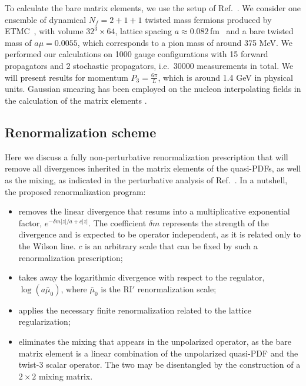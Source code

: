 \medskip
To calculate the bare matrix elements, we use the setup of Ref.~\cite{Alexandrou:2016jqi}.
We consider one ensemble of dynamical $N_f{=}2{+}1{+}1$ twisted mass fermions produced by ETMC~\cite{Baron:2010bv}, with volume
$32^3 {\times} 64$, lattice spacing $a {\approx}0.082$\,fm~\cite{Carrasco:2014cwa} and a bare twisted mass of $a\mu {=} 0.0055$,
which corresponds to a pion mass of around 375 MeV. We performed our calculations on 1000 gauge configurations with 15
forward propagators and 2 stochastic propagators, i.e.\ 30000 measurements in total. We will present results for momentum $P_3=\frac{6\pi}{L}$,
which is around 1.4 GeV in physical units. Gaussian smearing has been employed on the nucleon interpolating fields in the calculation of the matrix elements
\cite{Alexandrou:2016jqi}.

\vspace*{0.25cm}
\subsection{Renormalization scheme}
\label{sec:scheme}
\vspace*{0.15cm}

Here we discuss a fully non-perturbative renormalization prescription that will remove all divergences inherited in the matrix elements
of the quasi-PDFs, as well as the mixing, as indicated in the perturbative analysis of Ref.~\cite{Constantinou:2017sej}. In a nutshell, the proposed renormalization program:
\begin{itemize}
\item[\bf 1] removes the linear divergence that resums into a multiplicative exponential factor,
$e^{-\delta m |z|/a + c |z|}$. The coefficient $\delta m$ represents the strength of the divergence and is
expected to be operator independent, as it is related only to the Wilson line. $c$ is an arbitrary scale
\cite{Sommer:2015hea} that can be fixed by such a renormalization prescription;
\item[\bf 2] takes away the logarithmic divergence with respect to the regulator, $\log(a\bar\mu_0)$, where $\bar\mu_0$ is
the RI$'$ renormalization scale;
\item[\bf 3] applies the necessary finite renormalization related to the lattice regularization;
\item[\bf 4] eliminates the mixing that appears in the unpolarized operator, as the bare matrix element is
a linear combination of the unpolarized quasi-PDF and the twist-3 scalar operator. The two may be disentangled by
the construction of a $2{\times}2$ mixing matrix.
\end{itemize}


